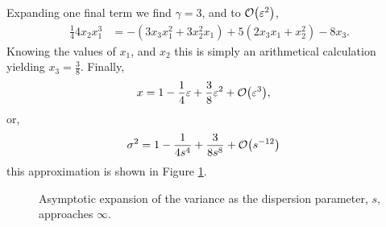 Expanding one final term we find $\gamma = 3$, and to $\bigO{\eps^2}$,
\begin{align*}
\frac{1}{4} 4x_2 x_1^3 &= -(3x_3 x_1^2 + 3x_2^2 x_1) + 5(2x_3 x_1 + x_2^2) - 8x_3.
\end{align*}
Knowing the values of $x_1$, and $x_2$ this is simply an arithmetical calculation yielding $x_3 = \frac{3}{8}$. Finally,
\begin{align*}
x &= 1 - \frac{1}{4}\eps + \frac{3}{8}\eps^2 + \bigO{\eps^3},
\end{align*}
or,
\begin{align*}
\sigma^2 &= 1 - \frac{1}{4s^4} + \frac{3}{8s^8} + \bigO{s^{-12}}
\end{align*}
this approximation is shown in Figure \ref{fig:limsinfty}. \\
\begin{figure}[tbp]

\caption[Asymptotic expansion of the variance as the dispersion parameter approaches $\infty$.]{Asymptotic expansion of the variance as the dispersion parameter, $s$, approaches $\infty$.}
\label{fig:limsinfty}
\end{figure}

